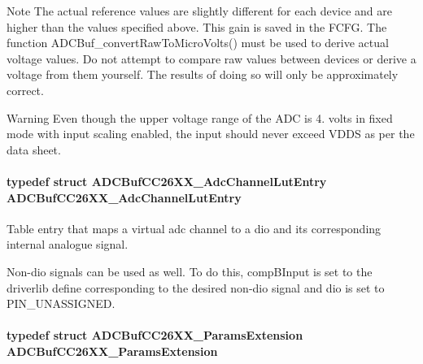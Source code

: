 \begin{DoxyNote}{Note}
The actual reference values are slightly different for each device and are higher than the values specified above. This gain is saved in the F\+C\+F\+G. The function A\+D\+C\+Buf\+\_\+convert\+Raw\+To\+Micro\+Volts() must be used to derive actual voltage values. Do not attempt to compare raw values between devices or derive a voltage from them yourself. The results of doing so will only be approximately correct.
\end{DoxyNote}
\begin{DoxyWarning}{Warning}
Even though the upper voltage range of the A\+D\+C is 4. volts in fixed mode with input scaling enabled, the input should never exceed V\+D\+D\+S as per the data sheet. 
\end{DoxyWarning}
\paragraph[{A\+D\+C\+Buf\+C\+C26\+X\+X\+\_\+\+Adc\+Channel\+Lut\+Entry}]{\setlength{\rightskip}{0pt plus 5cm}typedef struct {\bf A\+D\+C\+Buf\+C\+C26\+X\+X\+\_\+\+Adc\+Channel\+Lut\+Entry}  {\bf A\+D\+C\+Buf\+C\+C26\+X\+X\+\_\+\+Adc\+Channel\+Lut\+Entry}}\label{_a_d_c_buf_c_c26_x_x_8h_a99e197fd4f1d0021a0737f74f80d2643}


Table entry that maps a virtual adc channel to a dio and its corresponding internal analogue signal. 

Non-\/dio signals can be used as well. To do this, comp\+B\+Input is set to the driverlib define corresponding to the desired non-\/dio signal and dio is set to P\+I\+N\+\_\+\+U\+N\+A\+S\+S\+I\+G\+N\+E\+D. 
\paragraph[{A\+D\+C\+Buf\+C\+C26\+X\+X\+\_\+\+Params\+Extension}]{\setlength{\rightskip}{0pt plus 5cm}typedef struct {\bf A\+D\+C\+Buf\+C\+C26\+X\+X\+\_\+\+Params\+Extension}  {\bf A\+D\+C\+Buf\+C\+C26\+X\+X\+\_\+\+Params\+Extension}}\label{_a_d_c_buf_c_c26_x_x_8h_afac55b5d59cd880fecafb9a71f73162b}



